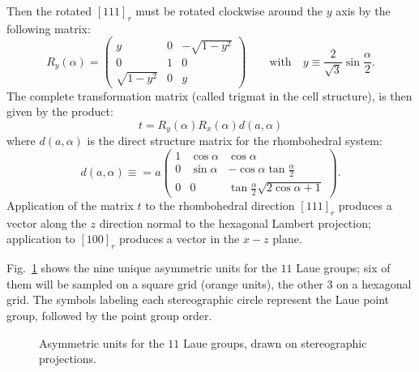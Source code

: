 \documentclass[DIV=calc, paper=letter, fontsize=11pt]{scrartcl}	 %
\begin{document}
Then the rotated $[111]_r$ must be rotated clockwise around the $y$ axis by the following matrix:
\begin{equation}
	R_y(\alpha) = \left(\begin{array}{ccc}
	y & 0 & -\sqrt{1-y^2}\\
	0 & 1 & 0\\
	\sqrt{1-y^2} & 0 & y\end{array}\right)\qquad\text{with}\quad y\equiv\frac{2}{\sqrt{3}}\sin\frac{\alpha}{2}.
\end{equation}
The complete transformation matrix (called \textsf{trigmat} in the \textsf{cell} structure), is then given by
the product:
\begin{equation}
	t = R_y(\alpha) R_x(\alpha) d(a,\alpha)
\end{equation}
where $d(a,\alpha)$ is the direct structure matrix for the rhombohedral system:
\begin{equation}
	d(a,\alpha)\equiv = a\left(\begin{array}{ccc}
	1 & \cos\alpha & \cos\alpha \\
	0 & \sin\alpha & -\cos\alpha\tan\frac{\alpha}{2}\\
	0 & 0 & \tan\frac{\alpha}{2}\sqrt{2\cos\alpha+1}\end{array}\right).
\end{equation}
Application of the matrix $t$ to the rhombohedral direction $[111]_r$ produces a vector along the $z$ direction normal to the 
hexagonal Lambert projection; application to $[100]_r$ produces a vector in the $x-z$ plane.


Fig.~\ref{fig:Laue-hemispheres} shows the nine unique asymmetric units for the $11$ Laue groups; six of them will be sampled on a square grid 
(orange units), the other $3$ on a hexagonal grid.  The symbols labeling each stereographic circle represent the Laue point group,
followed by the point group order.  

\begin{figure}[t]
\centering\leavevmode
{}
\caption{\label{fig:Laue-hemispheres}Asymmetric units for the $11$ Laue groups, drawn on stereographic projections.}
\end{figure}
\end{document}
